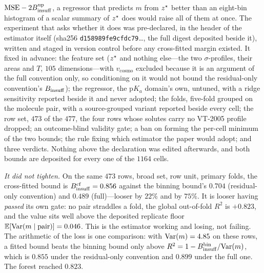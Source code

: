 $\mathrm{MSE}-2B_{\mathrm{insuff}}^{\mathrm{up}}$, a regressor that predicts $m$ from $z^\star$ better than an
eight-bin histogram of a scalar summary of $z^\star$ does would raise all of them at once. The
experiment that asks whether it does was pre-declared, in the header of the estimator itself
(sha256 \texttt{d158989fe9cfdc79}\ldots, the full digest
deposited beside it), written and staged in version control before any cross-fitted margin
existed. It fixed in advance: the feature set ($z^\star$ and nothing else---the two
$\sigma$-profiles, their areas and $T$, $105$ dimensions---with $v_{\mathrm{cosmo}}$ excluded
because it is an argument of the full convention only, so conditioning on it would not bound the
residual-only convention's $B_{\mathrm{insuff}}$); the regressor, the $\mathrm pK_a$ domain's own, untuned, with a ridge
sensitivity reported beside it and never adopted; the folds, five-fold grouped on the molecule pair, with a
source-grouped variant reported beside every cell; the row set, $473$ of the $477$, the four rows
whose solutes carry no VT-2005 profile dropped; an outcome-blind validity gate; a ban on forming
the per-cell minimum of the two bounds; the rule fixing which estimator the paper would adopt; and
three verdicts. Nothing above the declaration was edited afterwards, and both
bounds are deposited for every one of the $1164$ cells.

\emph{It did not tighten.} On the same $473$ rows, broad set, row unit, primary folds, the
cross-fitted bound is $B_{\mathrm{insuff}}^{\mathrm{cf}}=0.856$ against the binning bound's $0.704$ (residual-only
convention) and $0.489$ (full)---looser by $22\%$ and by $75\%$. It is looser having
\emph{passed} its own gate: no pair straddles a fold, the global out-of-fold $R^2$ is $+0.823$, and
the value sits well above the deposited replicate floor $\mathbb{E}[\mathrm{Var}(m\mid\text{pair})]=0.046$. This
is the estimator working and losing, not failing. The arithmetic of the loss is one comparison:
with $\mathrm{Var}(m)=4.85$ on these rows, a fitted bound beats the binning bound only above
$R^2=1-B_{\mathrm{insuff}}^{\mathrm{bin}}/\mathrm{Var}(m)$, which is $0.855$ under the residual-only convention and $0.899$
under the full one. The forest reached $0.823$.

